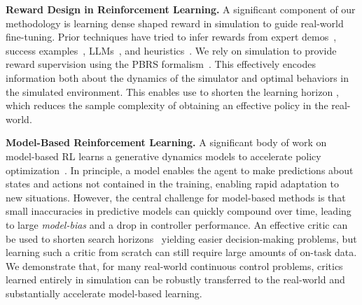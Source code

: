 \noindent\textbf{Reward Design in Reinforcement Learning.} 
A significant component of our methodology is learning dense shaped reward in simulation to guide real-world fine-tuning. Prior techniques have tried to infer rewards from expert demos~\citep{ziebart2008maxentirl, ho2016generative}, success examples~\citep{fu2018variational,li2021mural}, LLMs~\citep{ma2023eureka, yu2023language}, and heuristics~\citep{margolisrapid, dota2}. We rely on simulation to provide reward supervision using the PBRS formalism~\citep{ng1999policy}. This effectively encodes information both about the dynamics of the simulator and optimal behaviors in the simulated environment. This enables use to shorten the learning horizon \citep{cheng2021heuristic,westenbroek2022lyapunov}, which reduces the sample complexity of obtaining an effective policy in the real-world. 
\begin{comment}
Another line of work complementary to our comes from \cite{eysenbach2020off, liu2022dara, xu2023cross, niu2022trust}, which relabel rewards from off-task (simulated) data, effectively up-weighting transitions that approximately match the dynamics observed in the target domain. These works focus on the \emph{retrieval} of useful samples from prior datasets with shifted dynamics. In contrast, our approach uses prior data to guide the discovery of novel sequences of states and actions in the target domain. In principle, these techniques could be used in conjunction; we leave this to future work. 
\end{comment}



\noindent\textbf{Model-Based Reinforcement Learning.} A significant body of work on model-based RL learns a generative dynamics models to accelerate policy optimization~\citep{sutton1991dyna, wang2019exploring, janner2019trust, yu2020mopo, kidambi2020morel, ebert2018visual,zhang2019solar}. In principle, a model enables the agent to make predictions about states and actions not contained in the training, enabling rapid adaptation to new situations. However, the central challenge for model-based methods is that small inaccuracies in predictive models can quickly compound over time, leading to large \emph{model-bias} and a drop in controller performance. An effective critic can be used to shorten search horizons~\citep{hansen2024tdmpc, bhardwaj2020blending, hafner2019learning, jadbabaie2001unconstrained, grune2008infinite} yielding easier decision-making problems, but learning such a critic from scratch can still require large amounts of on-task data. We demonstrate that, for many real-world continuous control problems, critics learned entirely in simulation can be robustly transferred to the real-world and substantially accelerate model-based learning.  

